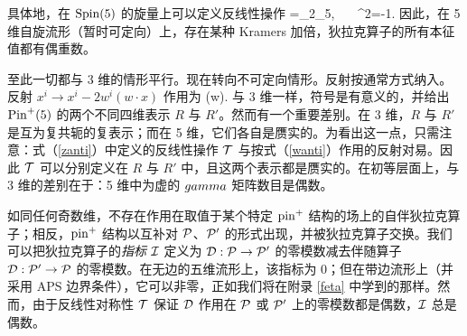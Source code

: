 具体地，在 $\Spin(5)$ 的旋量上可以定义反线性操作
\be\label{zanti}\T=\K\g_2\g_5,~~~ \T^2=-1.\ee
因此，在 5 维自旋流形（暂时可定向）上，存在某种 Kramers 加倍，狄拉克算子的所有本征值都有偶重数。

至此一切都与 3 维的情形平行。现在转向不可定向情形。反射按通常方式纳入。反射 $x^i\to x^i-2w^i(w\cdot x)$ 作用为
\be\label{wanti}\psi\to \pm (\gamma\cdot w)\psi. \ee
与 3 维一样，符号是有意义的，并给出 $\Pin^+(5)$ 的两个不同四维表示 $R$ 与 $R'$。然而有一个重要差别。在 3 维，$R$ 与 $R'$ 是互为复共轭的复表示；而在 5 维，它们各自是赝实的。为看出这一点，只需注意：式（\ref{zanti}）中定义的反线性操作 $\T$ 与按式（\ref{wanti}）作用的反射对易。因此 $\T$ 可以分别定义在 $R$ 与 $R'$ 中，且这两个表示都是赝实的。在初等层面上，与 3 维的差别在于：5 维中为虚的 $\\gamma$ 矩阵数目是偶数。


如同任何奇数维，不存在作用在取值于某个特定 $\pin^+$ 结构的场上的自伴狄拉克算子；相反，$\pin^+$ 结构以互补对 $\P$、$\P'$ 的形式出现，并被狄拉克算子交换。我们可以把狄拉克算子的{\it 指标} $\I$ 定义为 $\D:\P\to\P'$ 的零模数减去伴随算子 $\D:\P'\to\P$ 的零模数。在无边的五维流形上，该指标为 0；但在带边流形上（并采用 APS 边界条件），它可以非零，正如我们将在附录 \ref{feta} 中学到的那样。然而，由于反线性对称性 $\T$ 保证 $\D$ 作用在 $\P$ 或 $\P'$ 上的零模数都是偶数，$\I$ 总是偶数。

